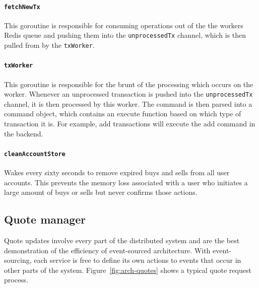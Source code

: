 \paragraph{\texttt{fetchNewTx}}
This goroutine is responsible for consuming operations out of the the workers Redis queue and pushing them into the \texttt{unprocessedTx} channel, which is then pulled from by the \texttt{txWorker}.

\paragraph{\texttt{txWorker}}
This goroutine is responsible for the brunt of the processing which occurs on the worker.
Whenever an unprocessed transaction is pushed into the \texttt{unprocessedTx} channel, it is then processed by this worker.
The command is then parsed into a command object, which contains an execute function based on which type of transaction it is.
For example, add transactions will execute the add command in the backend.

\paragraph{\texttt{cleanAccountStore}}
Wakes every sixty seconds to remove expired buys and sells from all user accounts.
This prevents the memory loss associated with a user who initiates a large amount of buys or sells but never confirms those actions.

\subsection{Quote manager}
Quote updates involve every part of the distributed system and are the best demonstration of the efficiency of event-sourced architecture.
With event-sourcing, each service is free to define its own actions to events that occur in other parts of the system.
Figure~\ref{fig:arch-quotes} shows a typical quote request process.

